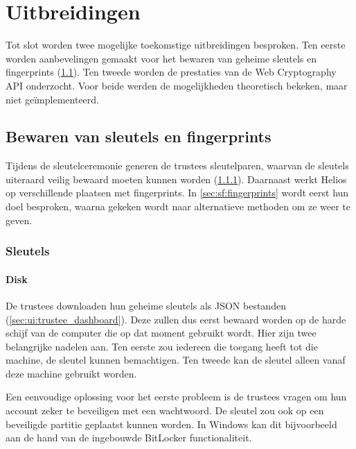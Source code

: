 % 
%

\chapter{Uitbreidingen}
\label{chap:uitbreidingen}

Tot slot worden twee mogelijke toekomstige uitbreidingen besproken. Ten eerste worden aanbevelingen gemaakt voor het bewaren van geheime sleutels en fingerprints (\ref{chap:sleutels_en_fingerprints}). Ten tweede worden de prestaties van de Web Cryptography API onderzocht. Voor beide werden de mogelijkheden theoretisch bekeken, maar niet ge\"implementeerd.

\section{Bewaren van sleutels en fingerprints}
\label{chap:sleutels_en_fingerprints}

Tijdens de sleutelceremonie generen de trustees sleutelparen, waarvan de sleutels uiteraard veilig bewaard moeten kunnen worden (\ref{sec:sf:sleutels}). Daarnaast werkt Helios op verschillende plaatsen met fingerprints. In \ref{sec:sf:fingerprints} wordt eerst hun doel besproken, waarna gekeken wordt naar alternatieve methoden om ze weer te geven.

\subsection{Sleutels}
\label{sec:sf:sleutels}

\subsubsection{Disk}
\label{sec:sf:disk}

De trustees downloaden hun geheime sleutels als JSON bestanden (\ref{sec:ui:trustee_dashboard}). Deze zullen dus eerst bewaard worden op de harde schijf van de computer die op dat moment gebruikt wordt. Hier zijn twee belangrijke nadelen aan. Ten eerste zou iedereen die toegang heeft tot die machine, de sleutel kunnen bemachtigen. Ten tweede kan de sleutel alleen vanaf deze machine gebruikt worden.

\npar Een eenvoudige oplossing voor het eerste probleem is de trustees vragen om hun account zeker te beveiligen met een wachtwoord. De sleutel zou ook op een beveiligde partitie geplaatst kunnen worden. In Windows kan dit bijvoorbeeld aan de hand van de ingebouwde BitLocker functionaliteit.\cite{site:bitlocker}

